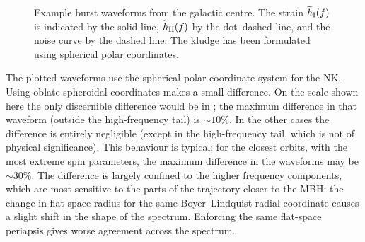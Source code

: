 \begin{figure}%
  \begin{center}
    \quad
\caption{Example burst waveforms from the galactic centre. The strain $\widetilde{h}_\mathrm{I}(f)$ is indicated by the solid line, $\widetilde{h}_\mathrm{II}(f)$ by the dot--dashed line, and the noise curve by the dashed line. The kludge has been formulated using spherical polar coordinates.\label{fig:Examples}}
  \end{center}
\end{figure}

The plotted waveforms use the spherical polar coordinate system for the NK. Using oblate-spheroidal coordinates makes a small difference. On the scale shown here the only discernible difference would be in ; the maximum difference in that waveform (outside the high-frequency tail) is $\sim 10\%$. In the other cases the difference is entirely negligible (except in the high-frequency tail, which is not of physical significance). This behaviour is typical; for the closest orbits, with the most extreme spin parameters, the maximum difference in the waveforms may be $\sim 30\%$. The difference is largely confined to the higher frequency components, which are most sensitive to the parts of the trajectory closer to the MBH: the change in flat-space radius for the same Boyer--Lindquist radial coordinate causes a slight shift in the shape of the spectrum. Enforcing the same flat-space periapsis gives worse agreement across the spectrum.

